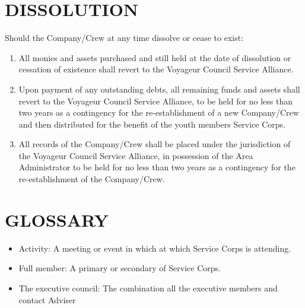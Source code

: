 \documentclass{Service_Corps_Document}
\begin{document}
    \section{DISSOLUTION}
    Should the Company/Crew at any time dissolve or cease to exist:
    \begin{enumerate}
        \item All monies and assets purchased and still held at the date of dissolution or cessation of existence shall revert to the Voyageur Council Service Alliance.
        \item Upon payment of any outstanding debts, all remaining funds and assets shall revert to the Voyageur Council Service Alliance, to be held for no less than two years as a contingency for the re-establishment of a new Company/Crew and then distributed for the benefit of the youth members Service Corps.
        \item All records of the Company/Crew shall be placed under the jurisdiction of the Voyageur Council Service Alliance, in possession of the Area Administrator to be held for no less than two years as a contingency for the re-establishment of the Company/Crew.
    \end{enumerate}


    \section{GLOSSARY}
    \begin{itemize}
        \item Activity: A meeting or event in which at which Service Corps is attending.
        \item Full member: A primary or secondary of Service Corps.
        \item The executive council: The combination all the executive members and contact Adviser
    \end{itemize}
\end{document}
